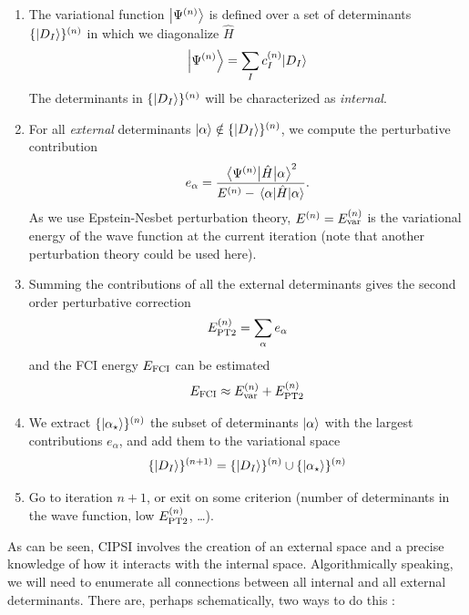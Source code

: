 \documentclass[./thesis.tex]{subfiles}
\begin{document}
\begin{enumerate}
\item

The variational function $\ket {\Psi^{(n)}}$ is defined over a set of determinants $\{\ket{D_I}\}^{(n)}$ in which we diagonalize $\widehat{H}$
\begin{equation}
\ket{\Psi^{(n)}} = \sum_{I} c_I^{(n)} {\ket{D_I}}
\end{equation}
The determinants in $\{\ket{D_I}\}^{(n)}$ will be characterized as \emph{internal}.

\item
For all \emph{external} determinants ${\ket{\alpha}} \notin \{\ket{D_I}\}^{(n)}$, we compute the perturbative contribution
\begin{equation}
e_\alpha = \frac{\mel{\Psi^{(n)}}{\hat{H}}{\alpha}^2}{E^{(n)} - \mel{\alpha}{\hat{H}}{\alpha}}.
\end{equation}
As we use Epstein-Nesbet perturbation theory, $E^{(n)}=E_\text{var}^{(n)}$ is the variational energy of the wave function at the current iteration (note that another perturbation theory could be used here).

\item Summing the contributions of all the external determinants gives the second order perturbative correction
\begin{equation}
E_\text{PT2}^{(n)} = \sum_{\alpha} e_\alpha
\end{equation}
and the FCI energy $E_\text{FCI}$ can be estimated
\begin{equation}
E_\text{FCI} \approx E_\text{var}^{(n)} + E_\text{PT2}^{(n)}
\end{equation}

\item
We extract $\{ \ket{\alpha_\star} \}^{(n)}$ the subset of determinants ${\ket{\alpha}}$ with the largest contributions $e_\alpha$, and add them to the variational space
\begin{equation}
\{\ket{D_I}\}^{(n+1)} = \{\ket{D_I}\}^{(n)} \cup \{ \ket {\alpha_\star} \}^{(n)}
\end{equation}

\item
Go to iteration $n+1$, or exit on some criterion (number of determinants in the wave function, low $E_\text{PT2}^{(n)}$, \dots).

\end{enumerate}



As can be seen, CIPSI involves the creation of an external space and a precise knowledge of how it interacts with the internal space. Algorithmically speaking, we will need to enumerate all connections between all internal and all external determinants.
There are, perhaps schematically, two ways to do this :
\end{document}

